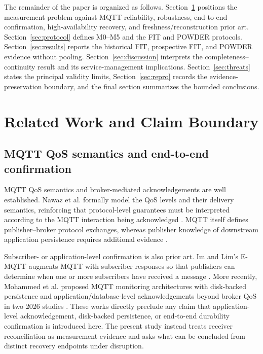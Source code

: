 \documentclass[journal]{IEEEtran}
\begin{document}
The remainder of the paper is organized as follows. Section~\ref{sec:related} positions the measurement problem against MQTT reliability, robustness, end-to-end confirmation, high-availability recovery, and freshness/reconstruction prior art. Section~\ref{sec:protocol} defines M0--M5 and the FIT and POWDER protocols. Section~\ref{sec:results} reports the historical FIT, prospective FIT, and POWDER evidence without pooling. Section~\ref{sec:discussion} interprets the completeness--continuity result and its service-management implications. Section~\ref{sec:threats} states the principal validity limits, Section~\ref{sec:repro} records the evidence-preservation boundary, and the final section summarizes the bounded conclusions.

\section{Related Work and Claim Boundary}
\label{sec:related}

\subsection{MQTT QoS semantics and end-to-end confirmation}

MQTT QoS semantics and broker-mediated acknowledgements are well established. Nawaz et al. formally model the QoS levels and their delivery semantics, reinforcing that protocol-level guarantees must be interpreted according to the MQTT interaction being acknowledged \cite{nawaz2019}. MQTT itself defines publisher--broker protocol exchanges, whereas publisher knowledge of downstream application persistence requires additional evidence \cite{mqtt5}.

Subscriber- or application-level confirmation is also prior art. Im and Lim's E-MQTT augments MQTT with subscriber responses so that publishers can determine when one or more subscribers have received a message \cite{emqtt}. More recently, Mohammed et al. proposed MQTT monitoring architectures with disk-backed persistence and application/database-level acknowledgements beyond broker QoS in two 2026 studies \cite{mohammed2026resilient,mohammed2026scalable}. These works directly preclude any claim that application-level acknowledgement, disk-backed persistence, or end-to-end durability confirmation is introduced here. The present study instead treats receiver reconciliation as measurement evidence and asks what can be concluded from distinct recovery endpoints under disruption.
\end{document}

